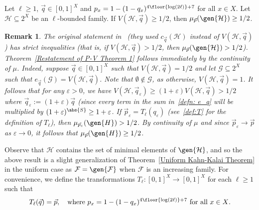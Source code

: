 \documentclass[12pt]{article}
\newtheorem*{remark*}{Remark}
\begin{document}
\begin{theorem}
\label{Restatement of P-V Theorem 1}
Let $\ell\geq 1$, $\vec{q}\in [0,1]^X$ and $p_x = 1-(1-q_x)^{4\floor{\log(2\ell)}+7}$ for all $x\in X$. Let $\mathcal{H}\subseteq 2^X$ be an $\ell$-bounded family. If $V(\mathcal{H},\vec{q})\geq 1/2$, then $\mu_{\vec{p}}(\gen{\mathcal{H}})\geq 1/2$.
\end{theorem} 

\begin{remark*}
The original statement in~\cite{park2023simple}
(they used $c_{\vec{q}}(\mathcal{H})$ instead of $V(\mathcal{H},\vec{q})$) has strict inequalities (that is, if $V(\mathcal{H},\vec{q})> 1/2$, then $\mu_{\vec{p}}(\gen{\mathcal{H}})> 1/2$). Theorem~\ref{Restatement of P-V Theorem 1} follows immediately by the continuity of $\mu$. Indeed, suppose $\vec{q}\in [0,1]^X$ such that $V(\mathcal{H},\vec{q}) = 1/2$ and let $\mathcal{G}\subseteq 2^X$ such that $e_{\vec{q}}(\mathcal{G}) = V(\mathcal{H},\vec{q})$. Note that $\emptyset\notin\mathcal{G}$, as otherwise, $V(\mathcal{H},\vec{q}) = 1$. It follows that for any $\varepsilon > 0$, we have $V(\mathcal{H},\vec{q}_\varepsilon)\geq (1+\varepsilon)V(\mathcal{H},\vec{q}) > 1/2$ where $\vec{q}_\varepsilon := (1+\varepsilon)\vec{q}$ (since every term in the sum in~\eqref{defn: e_q} will be multiplied by $(1+\varepsilon)^{\abs{S}}\geq 1+\varepsilon$. If $\vec{p}_\varepsilon = T_\ell(q_\varepsilon)$ (see~\eqref{def:T} for the definition of $T_\ell$), then $\mu_{\vec{p}_\varepsilon}(\gen{H}) > 1/2$. By continuity of $\mu$ and since $\vec{p}_\varepsilon\rightarrow\vec{p}$ as $\varepsilon\rightarrow 0$, it follows that $\mu_{\vec{p}}(\gen{H})\geq 1/2$.
\end{remark*}

Observe that $\mathcal{H}$ contains the set of minimal elements of $\gen{\mathcal{H}}$, and so the above result is a slight generalization of Theorem~\ref{Uniform Kahn-Kalai Theorem} in the uniform case as $\mathcal{F} = \gen{\mathcal{F}}$ when $\mathcal{F}$ is an increasing family. For convenience, we define the transformations $T_{\ell}:[0,1]^X\rightarrow [0,1]^X$ for each $\ell\geq 1$ such that 
\begin{equation}\label{def:T}
T_{\ell}(\vec{q}) = \vec{p},\quad \text{where\ } p_x = 1-(1-q_x)^{4\floor{\log(2\ell)}+7} \text{ for all $x\in X$.}
\end{equation}
\end{document}
